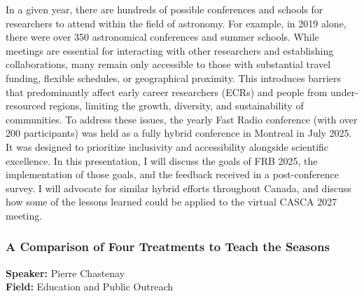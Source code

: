In a given year, there are hundreds of possible conferences and schools for researchers to attend within the field of astronomy. For example, in 2019 alone, there were over 350 astronomical conferences and summer schools. While meetings are essential for interacting with other researchers and establishing collaborations, many remain only accessible to those with substantial travel funding, flexible schedules, or geographical proximity. This introduces barriers that predominantly affect early career researchers (ECRs) and people from under-resourced regions, limiting the growth, diversity, and sustainability of communities. To address these issues, the yearly Fast Radio conference (with over 200 participants) was held as a fully hybrid conference in Montreal in July 2025. It was designed to prioritize inclusivity and accessibility alongside scientific excellence. In this presentation, I will discuss the goals of FRB 2025, the implementation of those goals, and the feedback received in a post-conference survey. I will advocate for similar hybrid efforts throughout Canada, and discuss how some of the lessons learned could be applied to the virtual CASCA 2027 meeting.

\hypertarget{abstract-talk-3}{}\label{abstract-page-talk-3}
\subsubsection*{A Comparison of Four Treatments to Teach the Seasons}
\textbf{Speaker:} Pierre Chastenay\\
\textbf{Field:} Education and Public Outreach

